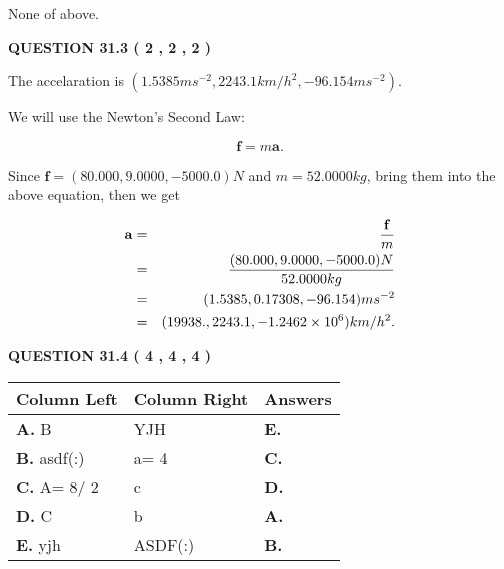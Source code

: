 \documentclass[12pt]{article}
\begin{document}
  
 
 
\noindent{}
 
 
 None of above.
 
 
 
 
  
\vspace{0.2in}
  
{\textbf{\Large{QUESTION
31.3 
 (           2 ,           2 ,           2 )
}}}
  
  
 
 
\noindent{}
 
 
The accelaration is
$(
1.5385ms^{-2},
2243.1km/h^2,
-96.154ms^{-2}
).
$
 
 
 
 
 
 
\noindent{}

We will use the Newton's Second Law:
 
\[
\mathbf{f}=m\mathbf{a}.
\]
 
Since $\mathbf{f}=( %
80.000,  %
9.0000,  %
-5000.0 )N$
and $m= %
52.0000kg$, bring them into the above equation, then we get
 
\begin{eqnarray*}
\mathbf{a}&=&\frac{\mathbf{f}}m  \\
&=&\frac{(
80.000 ,
9.0000 ,
-5000.0 )N
}{ %
52.0000 kg}  \\
&=&(
1.5385 ,
0.17308,
-96.154
)ms^{-2} \\
&=&(
19938. ,
2243.1 ,
-1.2462 \times 10^{6}
)km/h^2.
\end{eqnarray*}
 
 
 
  
\vspace{0.2in}
  
{\textbf{\Large{QUESTION
31.4 
 (           4 ,           4 ,           4 )
}}}
  
  
 
 
\noindent{}
  
  
\begin{tabular}{|l|l|l|}
 \hline
 Column Left & Column Right  & Answers       \\ 
 \hline
{\textbf{\large{
A.}}}
B
  & 
YJH
 & 
{\textbf{\large{
E.}}}
 \\ 
 \hline
{\textbf{\large{
B.}}}
asdf(:)
  & 
 a= %
4
 & 
{\textbf{\large{
C.}}}
 \\ 
 \hline
{\textbf{\large{
C.}}}
 A= %
8/ %
2

  & 
c
 & 
{\textbf{\large{
D.}}}
 \\ 
 \hline
{\textbf{\large{
D.}}}
C
  & 
b
 & 
{\textbf{\large{
A.}}}
 \\ 
 \hline
{\textbf{\large{
E.}}}
yjh
  & 
ASDF(:)
 & 
{\textbf{\large{
B.}}}
 \\ 
 \hline
 \end{tabular}
  
\end{document}
